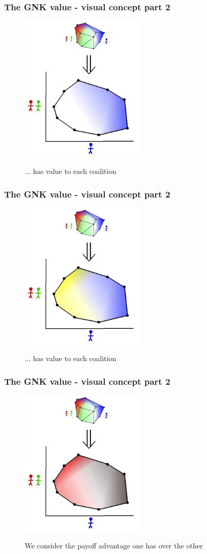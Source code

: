 \documentclass{beamer}
\begin{document}
\begin{frame} \frametitle{The GNK value - visual concept part 2} \begin{figure} \begin{center} \includegraphics[height=7cm]{figs/pa4} \end{center} ... has value to each coalition \end{figure} \end{frame}
\begin{frame} \frametitle{The GNK value - visual concept part 2} \begin{figure} \begin{center} \includegraphics[height=7cm]{figs/pa5} \end{center} ... has value to each coalition \end{figure} \end{frame}
\begin{frame} \frametitle{The GNK value - visual concept part 2} \begin{figure} \begin{center} \includegraphics[height=7cm]{figs/pa6} \end{center} We consider the payoff advantage one has over the other \end{figure} \end{frame}
\end{document}
